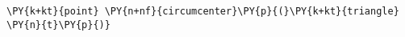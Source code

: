 \begin{Verbatim}[commandchars=\\\{\}]
    \PY{k+kt}{point} \PY{n+nf}{circumcenter}\PY{p}{(}\PY{k+kt}{triangle} \PY{n}{t}\PY{p}{)}
\end{Verbatim}
